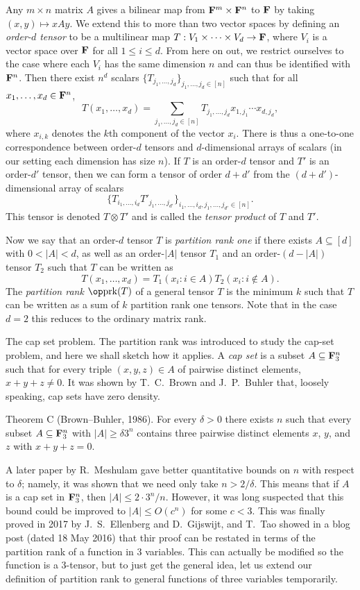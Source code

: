 Any $m\times n$ matrix $A$ gives a bilinear map from ${\bf F}^m \times {\bf F}^n$ to ${\bf F}$ by taking
$(x,y)\mapsto xAy$. We extend this to more than two vector spaces by defining an {\it order-$d$ tensor}
to be a multilinear map $T : V_1\times\cdots\times V_d\to {\bf F}$, where $V_i$ is a vector space over ${\bf F}$
for all $1\le i\le d$. From here on out,
we restrict ourselves to the case where each $V_i$ has the same dimension $n$ and can thus be identified
with ${\bf F}^n$. Then there exist $n^d$ scalars $\{T_{j_1,\ldots,j_d}\}_{j_1,\ldots,j_d\in [n]}$
such that for all $x_1,\ldots,x_d\in {\bf F}^n$,
$$ T(x_1, \ldots, x_d) = \sum_{j_1,\ldots,j_d\in [n]} T_{j_1,\ldots,j_d} x_{1,j_1}\cdots x_{d,j_d},$$
where $x_{i, k}$ denotes the $k$th component of the vector $x_i$. There is thus a one-to-one correspondence
between order-$d$ tensors and $d$-dimensional arrays of scalars (in our setting each dimension has size
$n$).
If $T$ is an order-$d$ tensor and $T'$ is an order-$d'$ tensor, then we can form a tensor of order $d+d'$
from the $(d+d')$-dimensional array of scalars
$$\{T_{i_1,\ldots,i_d}T'_{j_1,\ldots,j_{d'}}\}_{i_1,\ldots,i_{d},j_1,\ldots,j_{d'}\in [n]}.$$
This tensor is denoted $T\otimes T'$ and is called the {\it tensor product} of $T$ and $T'$.

Now we say that an order-$d$ tensor $T$ is {\it partition rank one} if there exists $A\subseteq [d]$
with $0 < |A| < d$, as well as an order-$|A|$ tensor $T_1$ and an order-$(d-|A|)$ tensor $T_2$ such
that $T$ can be written as
$$ T(x_1, \ldots, x_d) = T_1(x_i : i\in A)T_2(x_i : i\notin A).$$
The {\it partition rank} $\prk(T)$ of a
general tensor $T$ is the minimum $k$ such that $T$ can be written as a sum
of $k$ partition rank one tensors. Note that in the case $d=2$ this reduces to the ordinary matrix rank.

\medskip\boldlabel The cap set problem. The partition rank was introduced to study the cap-set problem,
and here we shall sketch how it applies. A {\it cap set} is a subset $A\subseteq {\bf F}_3^n$ such that for
every triple $(x,y,z)\in A$ of pairwise distinct elements, $x+y+z\ne 0$. It was shown by T.~C.~Brown
and J.~P.~Buhler that, loosely speaking, cap sets have zero density.

\parenproclaim Theorem C (Brown--Buhler{\rm, 1986}). For every $\delta>0$
there exists $n$ such that every subset $A\subseteq {\bf F}_3^n$ with $|A|\ge \delta 3^n$ contains three pairwise
distinct elements $x$, $y$, and $z$ with $x+y+z=0$.

A later paper by R.~Meshulam gave better quantitative
bounds on $n$ with respect to $\delta$; namely, it was shown that we need only take $n > 2/\delta$.
This means that if $A$ is a cap set in ${\bf F}_3^n$, then $|A| \le 2\cdot 3^n/n$. However, it was long
suspected that this bound could be improved to $|A| \le O(c^n)$ for some $c<3$. This was finally proved
in 2017 by J.~S.~Ellenberg and D.~Gijswijt, and T.~Tao showed in a blog post (dated 18 May 2016)
that thir proof can be restated in terms of the partition rank of a function in $3$ variables. This
can actually be modified so the function is a $3$-tensor, but to just get the general idea, let
us extend our definition of partition rank to general functions of three variables temporarily.

